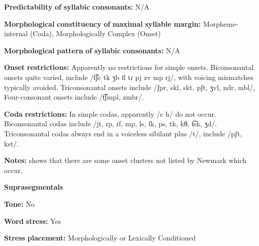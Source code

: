 \begin{styleBody}
\textbf{Predictability} \textbf{of} \textbf{syllabic} \textbf{consonants:} N/A
\end{styleBody}

\begin{styleBody}
\textbf{Morphological} \textbf{constituency} \textbf{of} \textbf{maximal} \textbf{syllable} \textbf{margin:} Morpheme-internal (Coda), Morphologically Complex (Onset)
\end{styleBody}

\begin{styleBody}
\textbf{Morphological} \textbf{pattern} \textbf{of} \textbf{syllabic} \textbf{consonants:} N/A
\end{styleBody}

\begin{styleBody}
\textbf{Onset} \textbf{restrictions:} Apparently no restrictions for simple onsets. Biconsonantal onsets quite varied, include /t͡ʃc tk ʒb fl tɾ pj zv mp rj/, with voicing mismatches typically avoided. Triconsonantal onsets include /ʃpr, skl, skt, pʃt, ʒvl, ndr, mbl/, Four-consonant onsets include /t͡ʃmpl, zmbr/.
\end{styleBody}

\begin{styleBody}
\textbf{Coda} \textbf{restrictions:} In simple codas, apparently /c h/ do not occur. Biconsonantal codas include /jt, ɾp, ɾf, mp, ls, fk, ps, tk,  kθ, t͡sk, ʒd/. Triconsonantal codas always end in a voiceless sibilant plus /t/, include /pʃt, kst/.
\end{styleBody}

\begin{styleBody}
\textbf{Notes:} \citet{Klippenstein2010} shows that there are some onset clusters not listed by Newmark which occur.
\end{styleBody}

\begin{styleBody}
\textbf{Suprasegmentals}
\end{styleBody}

\begin{styleBody}
\textbf{Tone:} No
\end{styleBody}

\begin{styleBody}
\textbf{Word} \textbf{stress:} Yes
\end{styleBody}

\begin{styleBody}
\textbf{Stress} \textbf{placement:} Morphologically or Lexically Conditioned
\end{styleBody}

